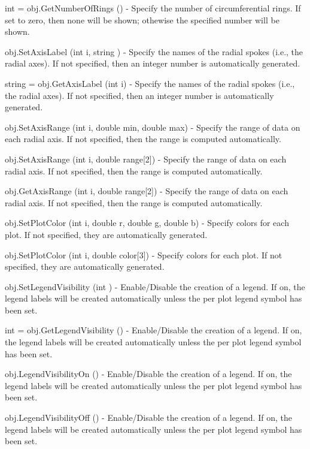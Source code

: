 \begin{DoxyItemize}
\item {\ttfamily int = obj.\-Get\-Number\-Of\-Rings ()} -\/ Specify the number of circumferential rings. If set to zero, then none will be shown; othewise the specified number will be shown.  
\item {\ttfamily obj.\-Set\-Axis\-Label (int i, string )} -\/ Specify the names of the radial spokes (i.\-e., the radial axes). If not specified, then an integer number is automatically generated.  
\item {\ttfamily string = obj.\-Get\-Axis\-Label (int i)} -\/ Specify the names of the radial spokes (i.\-e., the radial axes). If not specified, then an integer number is automatically generated.  
\item {\ttfamily obj.\-Set\-Axis\-Range (int i, double min, double max)} -\/ Specify the range of data on each radial axis. If not specified, then the range is computed automatically.  
\item {\ttfamily obj.\-Set\-Axis\-Range (int i, double range\mbox{[}2\mbox{]})} -\/ Specify the range of data on each radial axis. If not specified, then the range is computed automatically.  
\item {\ttfamily obj.\-Get\-Axis\-Range (int i, double range\mbox{[}2\mbox{]})} -\/ Specify the range of data on each radial axis. If not specified, then the range is computed automatically.  
\item {\ttfamily obj.\-Set\-Plot\-Color (int i, double r, double g, double b)} -\/ Specify colors for each plot. If not specified, they are automatically generated.  
\item {\ttfamily obj.\-Set\-Plot\-Color (int i, double color\mbox{[}3\mbox{]})} -\/ Specify colors for each plot. If not specified, they are automatically generated.  
\item {\ttfamily obj.\-Set\-Legend\-Visibility (int )} -\/ Enable/\-Disable the creation of a legend. If on, the legend labels will be created automatically unless the per plot legend symbol has been set.  
\item {\ttfamily int = obj.\-Get\-Legend\-Visibility ()} -\/ Enable/\-Disable the creation of a legend. If on, the legend labels will be created automatically unless the per plot legend symbol has been set.  
\item {\ttfamily obj.\-Legend\-Visibility\-On ()} -\/ Enable/\-Disable the creation of a legend. If on, the legend labels will be created automatically unless the per plot legend symbol has been set.  
\item {\ttfamily obj.\-Legend\-Visibility\-Off ()} -\/ Enable/\-Disable the creation of a legend. If on, the legend labels will be created automatically unless the per plot legend symbol has been set.  

\end{DoxyItemize}
